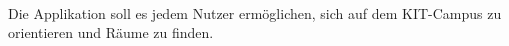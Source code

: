 \paragraph{}
Die Applikation soll es jedem Nutzer ermöglichen,
sich auf dem KIT-Campus zu orientieren und Räume zu finden.